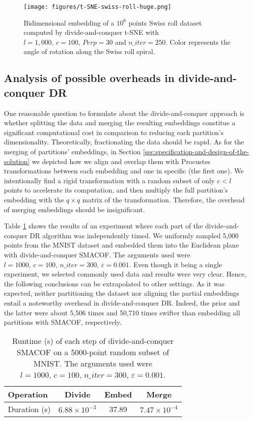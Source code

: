 \begin{figure}
    \centering
    \texttt{[image: figures/t-SNE-swiss-roll-huge.png]}
    \caption{Bidimensional embedding of a $10^6$ points Swiss roll dataset computed by divide-and-conquer t-SNE with $l=1,000, \, c=100, \, Perp=30$ and $n\_iter=250$. Color represents the angle of rotation along the Swiss roll spiral.}
    \label{fig:t-SNE-huge}
\end{figure}

\subsection{Analysis of possible overheads in divide-and-conquer DR}
\label{sec:overheads-DR}

One reasonable question to formulate about the divide-and-conquer approach is whether splitting the data and merging the resulting embeddings constitue a significant computational cost in comparison to reducing each partition's dimensionality. Theoretically, fractionating the data should be rapid. As for the merging of partitions' embeddings, in Section \ref{sec:specification-and-design-of-the-solution} we depicted how we align and overlap them with Procustes transformations between each embedding and one in specific (the first one). We intentionally find a rigid transformation with a random subset of only $c < l$ points to accelerate its computation, and then multiply the full partition's embedding with the $q\times q$ matrix of the transformation. Therefore, the overhead of merging embeddings should be insignificant.

Table \ref{tab:dc-overhead} shows the results of an experiment where each part of the divide-and-conquer DR algorithm was independently timed. We uniformly sampled 5,000 points from the MNIST dataset and embedded them into the Euclidean plane with divide-and-conquer SMACOF. The arguments used were $l=1000,\, c=100,\, n\_iter = 300,\, \varepsilon = 0.001$. Even though it being a single experiment, we selected commonly used data and results were very clear.  Hence, the following conclusions can be extrapolated to other settings. As it was expected, neither partitioning the dataset nor aligning the partial embeddings entail a noteworthy overhead in divide-and-conquer DR. Indeed, the prior and the latter were about 5,506 times and 50,710 times swifter than embedding all partitions with SMACOF, respectively.

\begin{table}
    \centering
    \caption{Runtime (s) of each step of divide-and-conquer SMACOF on a 5000-point random subset of MNIST. The arguments used were $l=1000,\, c=100,\, n\_iter = 300,\, \varepsilon = 0.001$.}
    \begin{tabular}{lccc}
        \toprule
        Operation    & Divide & Embed & Merge \\
        \midrule
        Duration (s) & $6.88 \times 10^{-3}$ & 37.89 & $7.47 \times 10^{-4}$ \\
        \bottomrule
    \end{tabular}
    \label{tab:dc-overhead}
\end{table}


